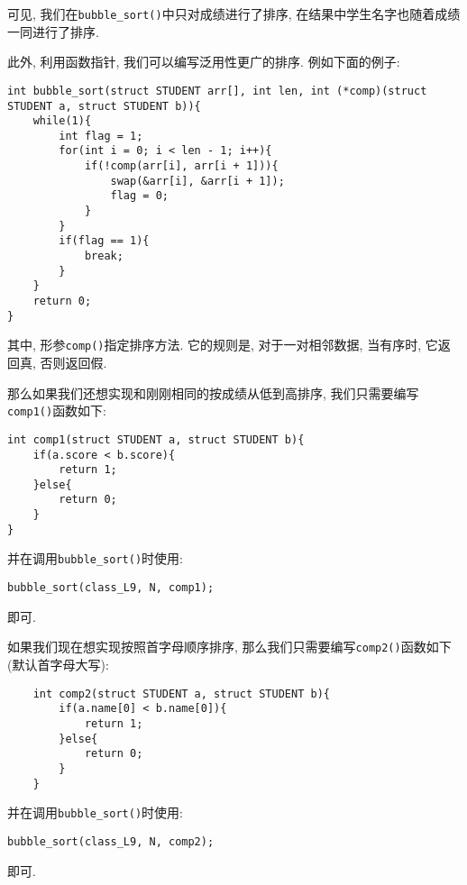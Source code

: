     可见, 我们在\texttt{bubble\_sort()}中只对成绩进行了排序, 在结果中学生名字也随着成绩一同进行了排序.

    \begin{mdframed}[linecolor=gray]

    此外, 利用函数指针, 我们可以编写泛用性更广的排序. 例如下面的例子:
\begin{lstlisting}
int bubble_sort(struct STUDENT arr[], int len, int (*comp)(struct STUDENT a, struct STUDENT b)){
    while(1){
        int flag = 1;
        for(int i = 0; i < len - 1; i++){
            if(!comp(arr[i], arr[i + 1])){
                swap(&arr[i], &arr[i + 1]);
                flag = 0;
            }
        }
        if(flag == 1){
            break;
        }
    }
    return 0;
}
\end{lstlisting}

    其中, 形参\texttt{comp()}指定排序方法. 它的规则是, 对于一对相邻数据, 当有序时, 它返回真, 否则返回假.

    那么如果我们还想实现和刚刚相同的按成绩从低到高排序, 我们只需要编写\texttt{comp1()}函数如下:
\begin{lstlisting}
int comp1(struct STUDENT a, struct STUDENT b){
    if(a.score < b.score){
        return 1;
    }else{
        return 0;
    }
}
\end{lstlisting}
    并在调用\texttt{bubble\_sort()}时使用:
\begin{lstlisting}
bubble_sort(class_L9, N, comp1);
\end{lstlisting}
    即可.

    如果我们现在想实现按照首字母顺序排序, 那么我们只需要编写\texttt{comp2()}函数如下(默认首字母大写):
\begin{lstlisting}
    int comp2(struct STUDENT a, struct STUDENT b){
        if(a.name[0] < b.name[0]){
            return 1;
        }else{
            return 0;
        }
    }
\end{lstlisting}
    并在调用\texttt{bubble\_sort()}时使用:
\begin{lstlisting}
bubble_sort(class_L9, N, comp2);
\end{lstlisting}
    即可.   

    \end{mdframed}